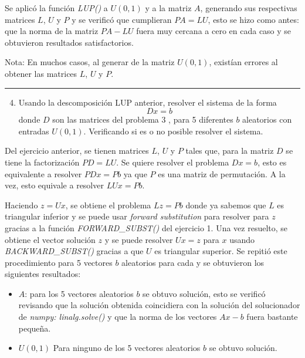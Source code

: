 Se aplicó la función \textit{LUP()} a $U(0,1)$ y a la matriz $A$, generando sus respectivas matrices $L$, $U$ y $P$ y se verificó que cumplieran $PA=LU$, esto se hizo como antes: que la norma de la matriz $PA-LU$ fuera muy cercana a cero en cada caso y se obtuvieron resultados satisfactorios. 

\textcolor{BrickRed}{Nota:} En muchos casos, al generar de la matriz $U(0,1)$, existían errores al obtener las matrices $L$, $U$ y $P$.

\vspace{5mm}
{\color{lightgray} \hrule}
\begin{enumerate} \setcounter{enumi}{3}
	\item Usando la descomposición LUP anterior, resolver el sistema de la forma
	$$D x=b$$
	donde $D$ son las matrices del problema 3 , para 5 diferentes $b$ aleatorios con entradas $U(0,1)$. Verificando si es o no posible resolver el sistema.
\end{enumerate}

Del ejercicio anterior, se tienen matrices $L$, $U$ y $P$ tales que, para la matriz $D$ se tiene la factorización $PD = LU$. Se quiere resolver el problema $Dx=b$, esto es equivalente a resolver $PDx = Pb$ ya que $P$ es una matriz de permutación. A la vez, esto equivale a resolver $LUx=Pb$.

Haciendo $z = Ux$, se obtiene el problema $Lz = Pb$ donde ya sabemos que $L$ es triangular inferior y se puede usar \textit{forward substitution} para resolver para $z$ gracias a la función \textit{FORWARD\_SUBST()} del ejercicio 1. Una vez resuelto, se obtiene el vector solución $z$ y se puede resolver $Ux = z$ para $x$ usando \textit{BACKWARD\_SUBST()} gracias a que $U$ es triangular superior. Se repitió este procedimiento para 5 vectores $b$ aleatorios para cada y se obtuvieron los siguientes resultados:

\begin{itemize}
	\item $A$: para los 5 vectores aleatorios $b$ se obtuvo solución, esto se verificó revisando que la solución obtenida coincidiera con la solución del solucionador de \textit{numpy: linalg.solve()} y que la norma de los vectores $Ax-b$ fuera bastante pequeña.
	
	\item $U(0,1)$ Para ninguno de los 5 vectores aleatorios $b$ se obtuvo solución. 
\end{itemize}

